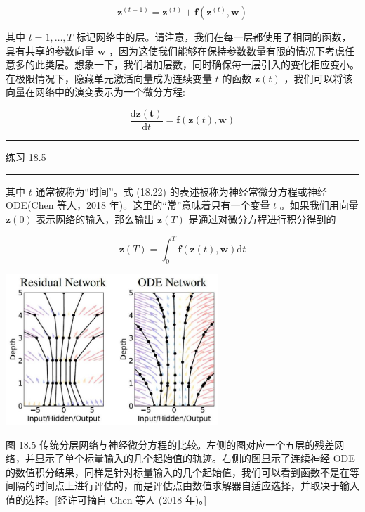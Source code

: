 \documentclass[10pt]{report}
\newcommand{\HRule}{\begin{center}\rule{0.9\linewidth}{0.2mm}\end{center}}
\begin{document}
\[
{\mathbf{z}}^{\left( t + 1\right) } = {\mathbf{z}}^{\left( t\right) } + \mathbf{f}\left( {{\mathbf{z}}^{\left( t\right) },\mathbf{w}}\right)  \tag{18.21}
\]

其中 \(t = 1,\ldots ,T\) 标记网络中的层。请注意，我们在每一层都使用了相同的函数，具有共享的参数向量 \(\mathbf{w}\) ，因为这使我们能够在保持参数数量有限的情况下考虑任意多的此类层。想象一下，我们增加层数，同时确保每一层引入的变化相应变小。在极限情况下，隐藏单元激活向量成为连续变量 \(t\) 的函数 \(\mathbf{z}\left( t\right)\) ，我们可以将该向量在网络中的演变表示为一个微分方程:

\[
\frac{\mathrm{d}\mathbf{z}\left( \mathbf{t}\right) }{\mathrm{d}t} = \mathbf{f}\left( {\mathbf{z}\left( t\right) ,\mathbf{w}}\right)  \tag{18.22}
\]

\HRule

练习 18.5

\HRule

其中 \(t\) 通常被称为“时间”。式 (18.22) 的表述被称为神经常微分方程或神经 ODE(Chen 等人，2018 年)。这里的“常”意味着只有一个变量 \(t\) 。如果我们用向量 \(\mathbf{z}\left( 0\right)\) 表示网络的输入，那么输出 \(\mathbf{z}\left( T\right)\) 是通过对微分方程进行积分得到的

\[
\mathbf{z}\left( T\right)  = {\int }_{0}^{T}\mathbf{f}\left( {\mathbf{z}\left( t\right) ,\mathbf{w}}\right) \mathrm{d}t \tag{18.23}
\]

\begin{center}
\includegraphics[max width=0.6\textwidth]{images/0194e279-9b28-703a-88f4-c3ac21e2010d_574_580_358_775_552_0.jpg}
\end{center}
\hspace*{3em} 

图 18.5 传统分层网络与神经微分方程的比较。左侧的图对应一个五层的残差网络，并显示了单个标量输入的几个起始值的轨迹。右侧的图显示了连续神经 ODE 的数值积分结果，同样是针对标量输入的几个起始值，我们可以看到函数不是在等间隔的时间点上进行评估的，而是评估点由数值求解器自适应选择，并取决于输入值的选择。[经许可摘自 Chen 等人 (2018 年)。]
\end{document}
